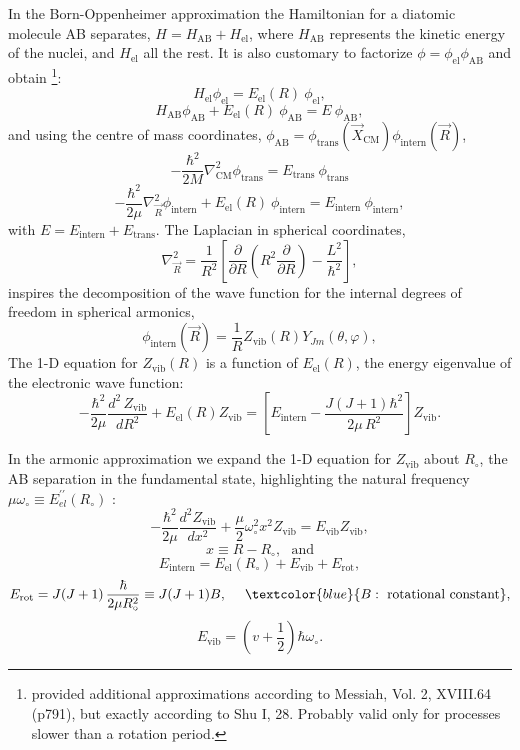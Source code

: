 In the Born-Oppenheimer approximation the Hamiltonian for a diatomic
molecule AB separates, $H = H_\mathrm{AB} + H_\mathrm{el} $, where
$H_\mathrm{AB}$ represents the kinetic energy of the nuclei, and
$H_\mathrm{el}$ all the rest. It is also customary to factorize $\phi =
\phi_\mathrm{el}
\phi_\mathrm{AB}$ and obtain  \footnote{provided additional
approximations according to Messiah, Vol. 2, XVIII.64 (p791), but
exactly according to Shu I, 28. Probably valid only for processes
slower than a rotation period.}:
\[H_\mathrm{el}  \phi_\mathrm{el} = E_\mathrm{el}(R)~  \phi_\mathrm{el}, \] 
\[H_\mathrm{AB}  \phi_\mathrm{AB} +  E_\mathrm{el}(R)~ \phi_\mathrm{AB} = E~ \phi_\mathrm{AB}, \] 
and using the centre of mass coordinates, $\phi_\mathrm{AB} =
\phi_\mathrm{trans}(\vec{X}_\mathrm{CM}) \phi_\mathrm{intern}(\vec{R})
$,
\[ -\frac{\hbar^2}{2M} \nabla^2_\mathrm{CM} \phi_\mathrm{trans}  = E_\mathrm{trans} ~\phi_\mathrm{trans} \]
\[ -\frac{\hbar^2}{2\mu} \nabla^2_{\vec{R}} \phi_\mathrm{intern} + E_\mathrm{el}(R) ~\phi_\mathrm{intern}  = E_\mathrm{intern} ~\phi_\mathrm{intern},\]
with $E=E_\mathrm{intern}+E_\mathrm{trans}$.
\foilhead{}
The Laplacian in spherical coordinates,
\[ \nabla^2_{\vec{R}} = \frac{1}{R^2} \left[ \frac{\partial}{\partial R} \left( R^2  \frac{\partial}{\partial R}  \right) - \frac{L^2}{\hbar^2} \right], \]
inspires the decomposition of the wave function for the internal
degrees of freedom in spherical armonics,
\[\phi_\mathrm{intern}(\vec{R}) = \frac{1}{R} Z_\mathrm{vib}(R) Y_{Jm}(\theta,\varphi), \]
The 1-D equation for $Z_\mathrm{vib}(R)$ is a function of
$E_\mathrm{el}(R)$, the energy eigenvalue of the electronic wave function:
\[-\frac{\hbar^2}{2\mu} \frac{d^2\,Z_\mathrm{vib}}{dR^2} +
E_\mathrm{el}(R)  Z_\mathrm{vib} = \left[ E_\mathrm{intern}  - \frac{
    J (J + 1) \hbar^2} {2\mu\,R^2} \right] Z_\mathrm{vib}. \]


\foilhead{} 
In the armonic approximation we expand the 1-D equation for
$Z_\mathrm{vib}$ about $R_{\circ}$, the AB separation in the
fundamental state, highlighting the natural frequency $\mu
\omega_\circ \equiv E^{\prime\prime}_{el}(R_\circ)$ :
\[ - \frac{\hbar^2}{2\mu} \frac{d^2 Z_\mathrm{vib}}{dx^2} + \frac{\mu}{2} \omega^2_\circ x^2 Z_\mathrm{vib} = E_\mathrm{vib} Z_\mathrm{vib}, \]
\[ x \equiv R - R_{\circ} , ~~~\mathrm{and}\] 
\[ \boxed{ E_\mathrm{intern} = E_\mathrm{el}(R_\circ) + E_\mathrm{vib} + E_\mathrm{rot},} \] 
\[ E_\mathrm{rot} = J (J+1) \, \frac{\hbar}{2\mu R^2_\circ} \equiv J
(J+1) B, ~~~~\textcolor{blue}{B: \mathrm{ ~rotational~constant}}, \]
\[ E_\mathrm{vib}  = (v + \frac{1}{2} ) \hbar \omega_\circ.  \]

